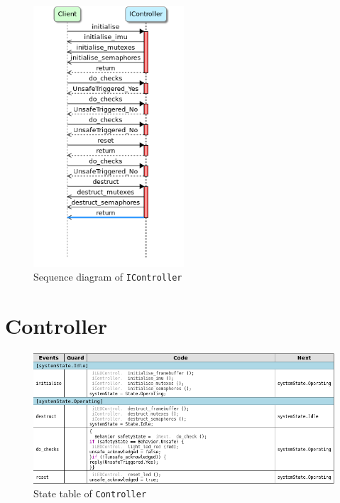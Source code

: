 \documentclass[12pt]{scrreprt}
\begin{document}
\begin{appendices}
\begin{figure}[H]
    \centering
    \includegraphics[width=0.5\textwidth]{Figures/results/modelling_figures/IController/IController_seq.png}
    \caption{Sequence diagram of \texttt{IController}}
    \label{fig:IController_seq}
\end{figure}

\section{Controller}
\label{aController}

\begin{figure}[H]
    \centering
    \includegraphics[width=\textwidth]{Figures/results/modelling_figures/Controller/Controller_state_table.png}
    \caption{State table of \texttt{Controller}}
    \label{fig:controll_state_table}
\end{figure}



\end{appendices}
\end{document}
